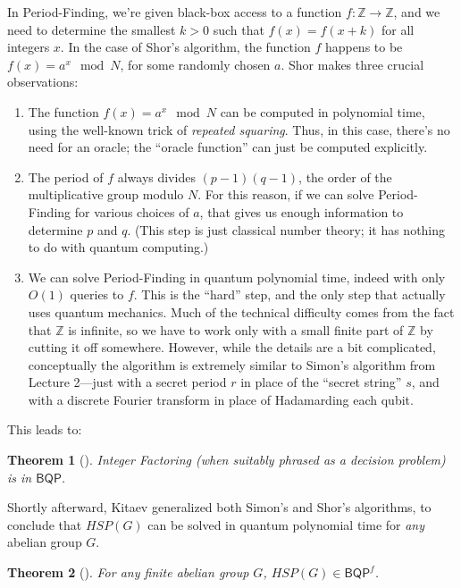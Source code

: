 \documentclass[12pt]{report}
\theoremstyle{plain}
\newtheorem{theorem}{Theorem}[section]
\theoremstyle{definition}
\newcommand{\Z}{{\mathbb Z}}
\begin{document}
In Period-Finding, we're given black-box access to a function $f:\Z \rightarrow \Z$, and we need to determine the smallest $k>0$ such that $f(x)=f(x+k)$ for all integers $x$. In the case of Shor's algorithm, the function $f$ happens to be $f(x)=a^x \mod N$, for some randomly chosen $a$. Shor makes three crucial observations:

\begin{enumerate}
\item[(1)] The function $f(x)=a^x \mod N$ can be computed in polynomial time, using the well-known trick of {\em repeated squaring}. Thus, in this case,
there's no need for an oracle; the ``oracle function'' can just be computed explicitly.
\item[(2)] The period of $f$ always divides $(p-1)(q-1)$, the order of the multiplicative group modulo $N$. For this reason, if we can solve Period-Finding for various choices of $a$, that gives us enough information to determine $p$ and $q$. (This step is just classical number theory; it has nothing to do with quantum computing.)
\item[(3)] We can solve Period-Finding in quantum polynomial time, indeed with only $O(1)$ queries to $f$. This is the ``hard'' step, and the only step that actually uses quantum mechanics. Much of the technical difficulty comes from the fact that $\Z$ is infinite, so we have to work only with a small
finite part of $\Z$ by cutting it off somewhere. However, while the details are a bit complicated, conceptually the algorithm is extremely similar to Simon's algorithm from Lecture 2---just with a secret period $r$ in place of the ``secret string'' $s$, and with a discrete Fourier transform in place of Hadamarding each qubit.
\end{enumerate}

This leads to:

\begin{theorem}[\cite{shor}]
Integer Factoring (when suitably phrased as a decision problem) is in $\mathsf{BQP}$.
\end{theorem}


Shortly afterward, Kitaev generalized both Simon's and Shor's algorithms, to conclude that $HSP(G)$ can be solved in quantum polynomial time for {\em any} abelian group $G$.

\begin{theorem}[\cite{kitaev:meas}]
For any finite abelian group $G$, $HSP(G) \in \mathsf{BQP}^f$.
\end{theorem}
\end{document}
